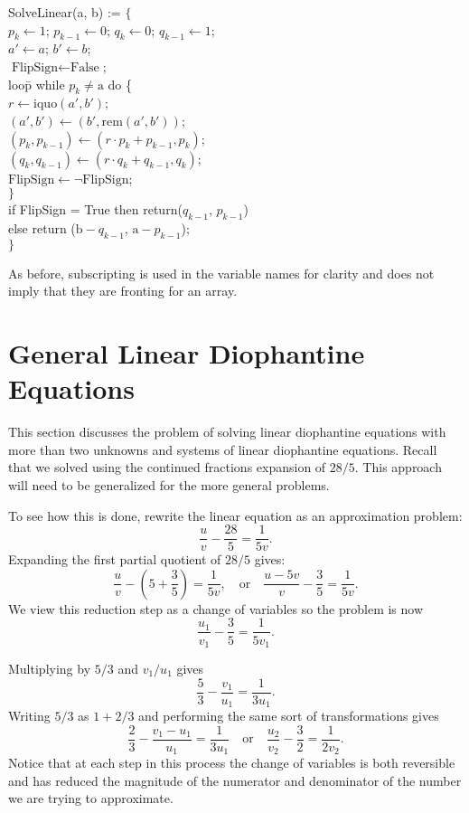 \begindsacode
SolveLinear(a, b) := $\{$\\
\> $p_k \leftarrow 1$; $p_{k-1} \leftarrow 0$; $q_k \leftarrow 0$; $q_{k-1} \leftarrow 1$; \\
\>  $a' \leftarrow a$; $b' \leftarrow b$; \\
\> $\mbox{FlipSign} \leftarrow \mbox{False}$; \\
\> loo\=p while $p_k \not = \mbox{a}$ do \{ \\
\> \> $r \leftarrow \mbox{iquo}(a', b')$; \\
\> \>  $(a', b') \leftarrow (b', \mbox{rem}(a', b'))$; \\
\> \> $(p_k, p_{k-1}) \leftarrow (r \cdot p_k + p_{k-1}, p_k)$; \\
\> \> $(q_k, q_{k-1}) \leftarrow (r \cdot q_k + q_{k-1}, q_k)$; \\
\> \> $\mbox{FlipSign} \leftarrow \neg \mbox{FlipSign}$; \\
\> \>$\}$ \\
\> if FlipSign = True then return($q_{k-1}$, $p_{k-1}$)  \\
\> else return ($\mbox{b} - q_{k-1}$, $\mbox{a} - p_{k-1}$); \\
\> $\}$
\enddsacode

\noindent
As before, subscripting is used in the variable names for clarity and
does not imply that they are fronting for an array.

\section{General Linear Diophantine Equations}
\label{General:Linear:Dio:Sec}

This section discusses the problem of solving linear diophantine
equations with more than two unknowns and systems of linear
diophantine equations.  Recall that we solved 
using the continued fractions expansion of $28/5$.  This approach will
need to be generalized for the more general problems.  

To see how this is done, rewrite the linear equation as an
approximation problem:
\[
\frac{u}{v} - \frac{28}{5} = \frac{1}{5v}.
\]
Expanding the first partial quotient of $28/5$ gives:
\[
\frac{u}{v} - \left(5 + \frac{3}{5}\right) = \frac{1}{5v},
\quad\mbox{or}\quad
\frac{u - 5v}{v} - \frac{3}{5} = \frac{1}{5v}.
\]
We view this reduction step as a change of variables so the problem is
now
\[
\frac{u_1}{v_1} - \frac{3}{5} = \frac{1}{5 v_1}.
\]

Multiplying by  $5/3$ and $v_1/u_1$ gives
\[
\frac{5}{3} - \frac{v_1}{u_1} = \frac{1}{3u_1}.
\]
Writing $5/3$ as $1 + 2/3$ and performing the same sort of
transformations gives
\[
\frac{2}{3} - \frac{v_1-u_1}{u_1} = \frac{1}{3u_1}
\quad\mbox{or}\quad
\frac{u_2}{v_2} - \frac{3}{2} = \frac{1}{2v_2}.
\]
Notice that at each step in this process the change of variables is
both reversible and has reduced the magnitude of the numerator and
denominator of the number we are trying to approximate.

